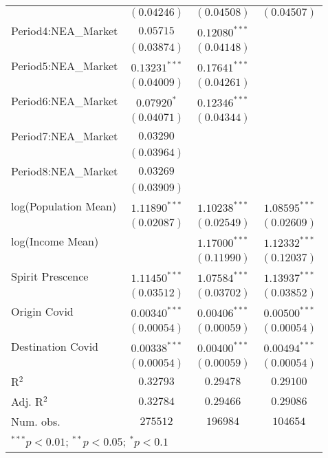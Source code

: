 \begin{tabular}{l c c c}
                     & $(0.04246)$      & $(0.04508)$      & $(0.04507)$      \\
Period4:NEA\_Market  & $0.05715$        & $0.12080^{***}$  &                  \\
                     & $(0.03874)$      & $(0.04148)$      &                  \\
Period5:NEA\_Market  & $0.13231^{***}$  & $0.17641^{***}$  &                  \\
                     & $(0.04009)$      & $(0.04261)$      &                  \\
Period6:NEA\_Market  & $0.07920^{*}$    & $0.12346^{***}$  &                  \\
                     & $(0.04071)$      & $(0.04344)$      &                  \\
Period7:NEA\_Market  & $0.03290$        &                  &                  \\
                     & $(0.03964)$      &                  &                  \\
Period8:NEA\_Market  & $0.03269$        &                  &                  \\
                     & $(0.03909)$      &                  &                  \\
log(Population Mean) & $1.11890^{***}$  & $1.10238^{***}$  & $1.08595^{***}$  \\
                     & $(0.02087)$      & $(0.02549)$      & $(0.02609)$      \\
log(Income Mean)     &                  & $1.17000^{***}$  & $1.12332^{***}$  \\
                     &                  & $(0.11990)$      & $(0.12037)$      \\
Spirit Prescence     & $1.11450^{***}$  & $1.07584^{***}$  & $1.13937^{***}$  \\
                     & $(0.03512)$      & $(0.03702)$      & $(0.03852)$      \\
Origin Covid         & $0.00340^{***}$  & $0.00406^{***}$  & $0.00500^{***}$  \\
                     & $(0.00054)$      & $(0.00059)$      & $(0.00054)$      \\
Destination Covid    & $0.00338^{***}$  & $0.00400^{***}$  & $0.00494^{***}$  \\
                     & $(0.00054)$      & $(0.00059)$      & $(0.00054)$      \\
\hline
R$^2$                & $0.32793$        & $0.29478$        & $0.29100$        \\
Adj. R$^2$           & $0.32784$        & $0.29466$        & $0.29086$        \\
Num. obs.            & $275512$         & $196984$         & $104654$         \\
\hline
\multicolumn{4}{l}{\scriptsize{$^{***}p<0.01$; $^{**}p<0.05$; $^{*}p<0.1$}}
\end{tabular}
